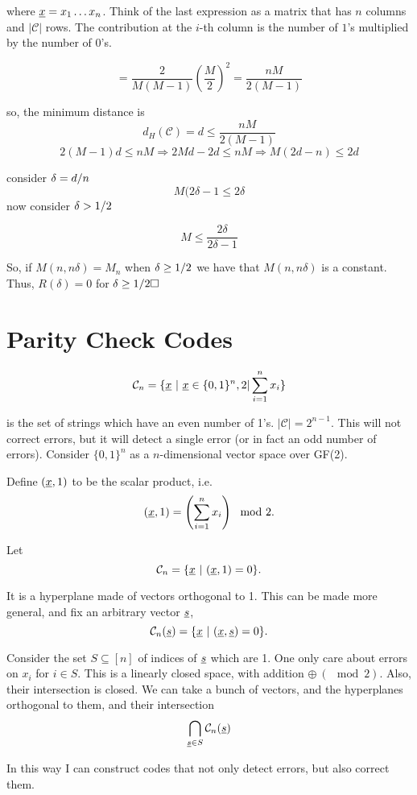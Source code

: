 where $\underline{x} = x_1\ldots x_n$. Think of the last expression as a matrix that has $n$ columns and $|\mathcal{C}|$ rows. The contribution at the $i$-th column is the number of $1$'s multiplied by the number of $0$'s.

\[
 =  \dfrac{2}{M(M-1)}\left(\dfrac{M}{2}\right)^2 = \dfrac{nM}{2(M-1)}
\]

so, the minimum distance is
\[
 d_H(\mathcal{C}) = d \leq \dfrac{nM}{2(M-1)}
\]
\[
2(M-1)d \leq nM \Rightarrow 2Md -2d \leq nM \Rightarrow M(2d-n) \leq 2d
\]

consider $\delta = {d}/{n}$
\[
 M(2\delta -1 \leq 2\delta
\]
now consider $\delta > {1}/{2}$

\[
 M \leq \dfrac{2\delta}{2\delta-1}
\]

So, if $M(n, n\delta) = M_n$ when $\delta \geq {1}/{2}$ we have that $M(n, n\delta)$ is a constant. Thus, $R(\delta) = 0$ for $\delta \geq \ifrac{1}{2} \hfill\Box$ 

\section{Parity Check Codes}

\[
 \mathcal{C}_n = \{\underline{x}\ |\ \underline{x} \in \{0, 1\}^n, 2|\sum_{i=1}^n x_i\}
\]

is the set of strings which have an even number of 1's. $|\mathcal{C}| = 2^{n-1}$. This will not correct errors, but it will detect a single error (or in fact an odd number of errors). Consider $\{0, 1\}^n$ as a $n$-dimensional vector space over GF(2).

Define $(\underline{x}, 1)$ to be the scalar product, i.e.
\[
 (\underline{x}, 1) = \left(\sum_{i=1}^n x_i\right) \mod 2.
\]

Let 
\[
 \mathcal{C}_n = \{\str{x}\ |\ (\str{x}, 1) = 0\}.
\]

It is a hyperplane made of vectors orthogonal to 1. This can be made more general, and fix an arbitrary vector $\underline{s}$,
\[
 \mathcal{C}_n(\underline{s}) = \{\underline{x}\ |\ (\underline{x}, \underline{s}) = 0\}.
\]

Consider the set $S \subseteq [n]$ of indices of $\underline{s}$ which are 1. One only care about errors on $x_i$ for $i \in S$. This is a linearly closed space, with addition $\oplus\ (\mod 2)$. Also, their intersection is closed. We can take a bunch of vectors, and the hyperplanes orthogonal to them, and their intersection
\[
 \bigcap_{\underline{s} \in S} \mathcal{C}_n(\underline{s})
\]

In this way I can construct codes that not only detect errors, but also correct them.

